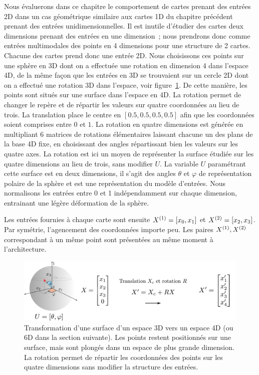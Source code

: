 \documentclass[../main]{subfiles}
\begin{document}
Nous évaluerons dans ce chapitre le comportement de cartes prenant des entrées 2D dans un cas géométrique similaire aux cartes 1D du chapitre précédent prenant des entrées unidimensionnelles. Il est inutile d'étudier des cartes deux dimensions prenant des entrées en une dimension~; nous prendrons donc comme entrées multimodales des points en 4 dimensions pour une structure de 2 cartes. Chacune des cartes prend donc une entrée 2D.
Nous choisissons ces points sur une sphère en 3D dont on a effectuée une rotation en dimension 4 dans l'espace 4D, de la même façon que les entrées en 3D se trouvaient sur un cercle 2D dont on a effectué une rotation 3D dans l'espace, voir figure~\ref{fig:sphere_inputs}. De cette manière, les points sont situés sur une surface dans l'espace en 4D. La rotation permet de changer le repère et de répartir les valeurs sur quatre coordonnées au lieu de trois. La translation place le centre en $[0.5,0.5,0.5,0.5]$ afin que les coordonnées soient comprises entre $0$ et $1$.
La rotation en quatre dimensions est générée en multipliant 6 matrices de rotations élémentaires laissant chacune un des plans de la base 4D fixe, en choisissant des angles répartissant bien les valeurs sur les quatre axes. La rotation est ici un moyen de représenter la surface étudiée sur les quatre dimensions au lieu de trois, sans modifier $U$.
La variable $U$ paramétrant cette surface est en deux dimensions, il s'agit des angles $\theta$ et $\varphi$ de représentation polaire de la sphère et est une représentation du modèle d'entrées. Nous normalisons les entrées entre 0 et 1 indépendamment sur chaque dimension, entrainant une légère déformation de la sphère.

Les entrées fournies à chaque carte sont ensuite $X^{({1})} = [x_0,x_1]$ et $X^{({2})} = [x_2,x_3]$. Par symétrie, l'agencement des coordonnées importe peu. Les paires $X^{({1})}, X^{({2})}$ correspondant à un même point sont présentées au même moment à l'architecture.

\begin{figure}
	\includegraphics[width=\textwidth]{sphere_inputs.pdf}
	\caption{Transformation d'une surface d'un espace 3D vers un espace 4D (ou 6D dans la section suivante). Les points restent positionnés sur une surface, mais sont plongés dans un espace de plus grande dimension. La rotation permet de répartir les coordonnées des points sur les quatre dimensions sans modifier la structure des entrées. \label{fig:sphere_inputs}}
\end{figure}
\end{document}
